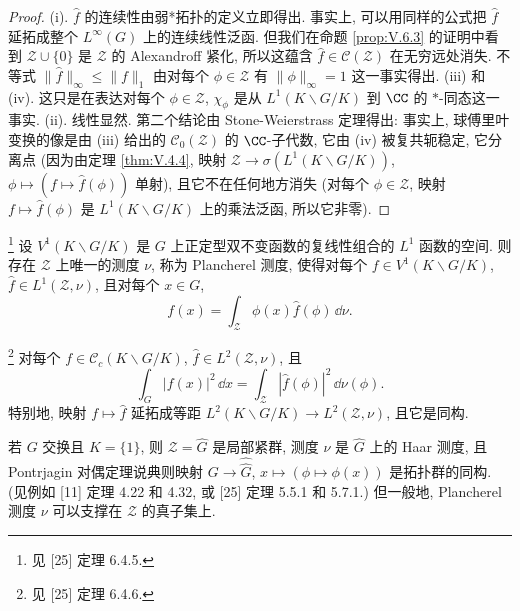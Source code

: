 \begin{proof}
(i). $\hat{f}$ 的连续性由弱*拓扑的定义立即得出. 事实上, 可以用同样的公式把 $\hat{f}$ 延拓成整个 $L^{\infty}(G)$ 上的连续线性泛函. 但我们在命题 \ref{prop:V.6.3} 的证明中看到 $\mathcal{Z} \cup \{0\}$ 是 $\mathcal{Z}$ 的 Alexandroff 紧化, 所以这蕴含 $\hat{f} \in \mathcal{C}(\mathcal{Z})$ 在无穷远处消失. 不等式 $\|\hat{f}\|_{\infty} \leq \|f\|_1$ 由对每个 $\phi \in \mathcal{Z}$ 有 $\|\phi\|_{\infty} = 1$ 这一事实得出.
(iii) 和 (iv). 这只是在表达对每个 $\phi \in \mathcal{Z}$, $\chi_{\phi}$ 是从 $L^1(K\backslash G/K)$ 到 $\CC$ 的 $*$-同态这一事实.
(ii). 线性显然. 第二个结论由 Stone-Weierstrass 定理得出: 事实上, 球傅里叶变换的像是由 (iii) 给出的 $\mathcal{C}_0(\mathcal{Z})$ 的 $\CC$-子代数, 它由 (iv) 被复共轭稳定, 它分离点 (因为由定理 \ref{thm:V.4.4}, 映射 $\mathcal{Z} \to \sigma(L^1(K\backslash G/K))$, $\phi \longmapsto (f \longmapsto \hat{f}(\phi))$ 单射), 且它不在任何地方消失 (对每个 $\phi \in \mathcal{Z}$, 映射 $f \longmapsto \hat{f}(\phi)$ 是 $L^1(K\backslash G/K)$ 上的乘法泛函, 所以它非零).
\end{proof}

\begin{theorem}[Fourier 反演]\footnote{见 {[}25{]} 定理 6.4.5.}
\label{thm:V.6.6}
设 $V^1(K\backslash G/K)$ 是 $G$ 上正定型双不变函数的复线性组合的 $L^1$ 函数的空间.
则存在 $\mathcal{Z}$ 上唯一的测度 $\nu$, 称为 Plancherel 测度, 使得对每个 $f \in V^1(K\backslash G/K)$, $\hat{f} \in L^1(\mathcal{Z}, \nu)$, 且对每个 $x \in G$,
\[
f(x) = \int_{\mathcal{Z}}\phi(x)\hat{f}(\phi)\,\dd\nu.
\]
\end{theorem}

\begin{theorem}[Plancherel 公式]\footnote{见 {[}25{]} 定理 6.4.6.}
\label{thm:V.6.7}
对每个 $f \in \mathcal{C}_c(K\backslash G/K)$, $\hat{f} \in L^2(\mathcal{Z}, \nu)$, 且
\[
\int_G |f(x)|^2\,\dd x = \int_{\mathcal{Z}}|\hat{f}(\phi)|^2\,\dd\nu(\phi).
\]
特别地, 映射 $f \longmapsto \hat{f}$ 延拓成等距 $L^2(K\backslash G/K) \to L^2(\mathcal{Z}, \nu)$, 且它是同构.
\end{theorem}

\begin{remark}[Pontrjagin 对偶]
\label{rem:V.6.8}
若 $G$ 交换且 $K = \{1\}$, 则 $\mathcal{Z} = \widehat{G}$ 是局部紧群, 测度 $\nu$ 是 $\widehat{G}$ 上的 Haar 测度, 且 Pontrjagin 对偶定理说典则映射 $G \to \widehat{\widehat{G}}$, $x \longmapsto (\phi \longmapsto \phi(x))$ 是拓扑群的同构. (见例如 {[}11{]} 定理 4.22 和 4.32, 或 {[}25{]} 定理 5.5.1 和 5.7.1.)
但一般地, Plancherel 测度 $\nu$ 可以支撑在 $\mathcal{Z}$ 的真子集上.
\end{remark}


